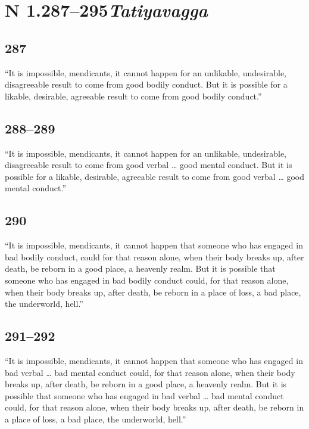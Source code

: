 \documentclass[12pt,openany]{book}%
\newcommand*{\suttatitleacronym}[1]{\smaller[2]{#1}\vspace*{.3em}}
\newcommand*{\suttatitleroot}[1]{\linebreak\smaller[2]\itshape{#1}}
\newcommand*{\tocacronym}[1]{\hspace*{-3.3em}{#1}\quad}
\newcommand*{\tocroot}[1]{(\textit{#1})}
\begin{document}
%
\section*{{\suttatitleacronym AN 1.287–295}{\suttatitleroot Tatiyavagga}}
\addcontentsline{toc}{section}{\tocacronym{AN 1.287–295} \tocroot{Tatiyavagga}}

\subsection*{287 }

“It is impossible, mendicants, it cannot happen for an unlikable, undesirable, disagreeable result to come from good bodily conduct. But it is possible for a likable, desirable, agreeable result to come from good bodily conduct.” 

\subsection*{288–289 }

“It is impossible, mendicants, it cannot happen for an unlikable, undesirable, disagreeable result to come from good verbal … good mental conduct. But it is possible for a likable, desirable, agreeable result to come from good verbal … good mental conduct.” 

\subsection*{290 }

“It is impossible, mendicants, it cannot happen that someone who has engaged in bad bodily conduct, could for that reason alone, when their body breaks up, after death, be reborn in a good place, a heavenly realm. But it is possible that someone who has engaged in bad bodily conduct could, for that reason alone, when their body breaks up, after death, be reborn in a place of loss, a bad place, the underworld, hell.” 

\subsection*{291–292 }

“It is impossible, mendicants, it cannot happen that someone who has engaged in bad verbal … bad mental conduct could, for that reason alone, when their body breaks up, after death, be reborn in a good place, a heavenly realm. But it is possible that someone who has engaged in bad verbal … bad mental conduct could, for that reason alone, when their body breaks up, after death, be reborn in a place of loss, a bad place, the underworld, hell.” 
\end{document}
